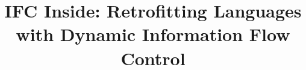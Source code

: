 \documentclass[9pt]{sigplanconf}
\newif\ifextended
\begin{document}


\title{
IFC Inside: Retrofitting Languages with Dynamic Information Flow Control
}
\ifextended
\subtitle{Extended Version}
\fi

\authorinfo{}{}

\maketitle




{\frenchspacing\scriptsize
  \setlength{\bibsep}{2pt}
  
  
}

\ifextended
\balance
\fi
\end{document}
